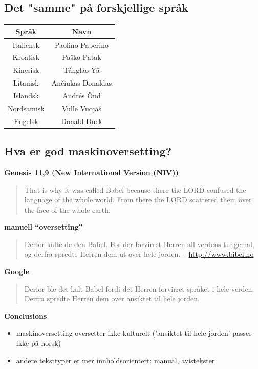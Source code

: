 \documentclass[a4paper,english,12pt]{article}
\begin{document}
\begin{spacing}{1.0}
\subsection{Det "samme" på forskjellige språk}
\begin{tabular}{|c|c|}
\hline
\textbf{Språk} & \textbf{Navn} \\
\hline
Italiensk &  Paolino Paperino  \\
\hline
Kroatisk &  Paško Patak  \\
\hline
Kinesisk & Tánglăo Yā \\
\hline
Litauisk & Ančiukas Donaldas \\
\hline
Islandsk & Andrés Önd \\
\hline
Nordsamisk & Vulle Vuojaš \\
\hline
Engelsk & Donald Duck \\
\hline
\end{tabular}
 

\subsection{Hva er god maskinoversetting?}

\textbf{Genesis 11,9 (New International Version (NIV))}
\begin{quote}
That is why it was called Babel because there the LORD confused the language of the whole world. From 
there the LORD scattered them over the face of the whole earth.
\end{quote}

\textbf{manuell ``oversetting''}
\begin{quote}
Derfor kalte de den Babel. For der forvirret Herren all verdens tungemål, og derfra spredte Herren dem ut over hele jorden.
-- \url{http://www.bibel.no}
\end{quote}

\textbf{Google}
\begin{quote}
Derfor ble det kalt Babel fordi det Herren forvirret språket i hele verden. Derfra spredte Herren dem over ansiktet til hele jorden.
\end{quote}
 
\textbf{Conclusions} 
\begin{itemize}
\item maskinoversetting oversetter ikke kulturelt ('ansiktet til hele jorden' passer ikke på norsk)
\item andere teksttyper er mer innholdsorientert: manual, avistekster
\end{itemize} 
 


\end{spacing}
\end{document}
